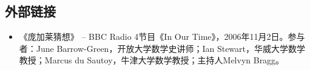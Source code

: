 \subsection{外部链接}
\begin{itemize}
\item 《庞加莱猜想》 – BBC Radio 4节目《In Our Time》，2006年11月2日。参与者：June Barrow-Green，开放大学数学史讲师；Ian Stewart，华威大学数学教授；Marcus du Sautoy，牛津大学数学教授；主持人Melvyn Bragg。
\end{itemize}